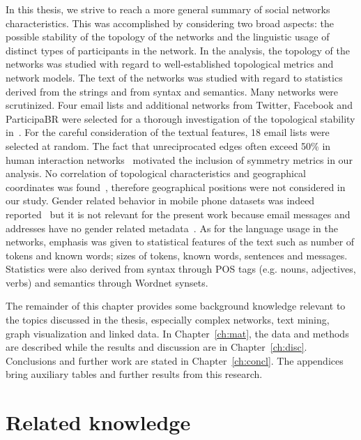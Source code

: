 In this thesis, we strive to reach a more general summary of social networks characteristics.
This was accomplished by considering two broad aspects:
the possible stability of the topology of the networks and the linguistic usage of distinct types of participants in the network.
In the analysis, the topology of the networks was studied with regard to well-established topological metrics and network models.
The text of the networks was studied with regard to statistics derived from the strings and from syntax and semantics.
Many networks were scrutinized.
Four email lists and additional networks from Twitter, Facebook and ParticipaBR were selected for a thorough investigation of
the topological stability in~\cite{stab}.
For the careful consideration of the textual features,
18 email lists were selected at random.
The fact that unreciprocated edges often exceed 50\% in human interaction networks~\cite{newmanEvolving} motivated the inclusion of symmetry metrics in our analysis. 
No correlation of topological characteristics and geographical coordinates was found~\cite{barabasiGeo},
therefore geographical positions were not considered in our study.
Gender related behavior in mobile phone datasets was indeed reported~\cite{barabasiSex}
but it is not relevant for the present work because email messages and addresses have no gender related metadata~\cite{gmanePack}. As for the language usage in the networks, emphasis was given to statistical features of the text such as number of tokens and known words; sizes of tokens, known words, sentences and messages. 
Statistics were also derived from syntax through POS tags (e.g. nouns, adjectives, verbs) and semantics through Wordnet synsets.

The remainder of this chapter provides some background knowledge relevant to the topics discussed in the thesis, especially complex networks, text mining, graph visualization and linked data. In Chapter~\ref{ch:mat},
the data and methods are described while the results and discussion are in Chapter~\ref{ch:disc}. 
Conclusions and further work are stated in Chapter~\ref{ch:concl}.
The appendices bring auxiliary tables and further results from this research.


\section{Related knowledge}
